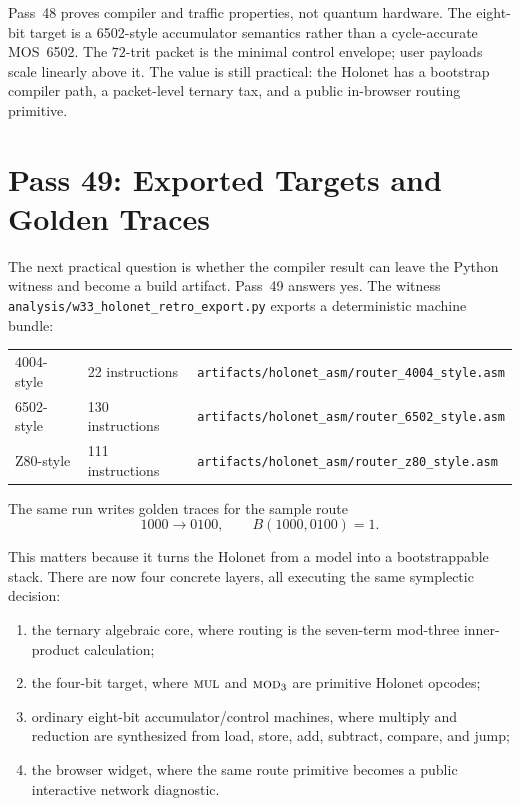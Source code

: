 \documentclass[11pt]{article}
\begin{document}
\begin{honestbox}
Pass~48 proves compiler and traffic properties, not quantum hardware.  The
eight-bit target is a 6502-style accumulator semantics rather than a
cycle-accurate MOS~6502.  The \(72\)-trit packet is the minimal control
envelope; user payloads scale linearly above it.  The value is still practical:
the Holonet has a bootstrap compiler path, a packet-level ternary tax, and a
public in-browser routing primitive.
\end{honestbox}

\section{Pass 49: Exported Targets and Golden Traces}
\label{sec:pass49}
The next practical question is whether the compiler result can leave the
Python witness and become a build artifact.  Pass~49 answers yes.  The witness
\texttt{analysis/w33\_holonet\_retro\_export.py} exports a deterministic
machine bundle:
\begin{center}
\begin{tabular}{lll}
4004-style & 22 instructions & \texttt{artifacts/holonet\_asm/router\_4004\_style.asm}\\
6502-style & 130 instructions & \texttt{artifacts/holonet\_asm/router\_6502\_style.asm}\\
Z80-style & 111 instructions & \texttt{artifacts/holonet\_asm/router\_z80\_style.asm}
\end{tabular}
\end{center}
The same run writes golden traces for the sample route
\[
  1000\to0100,\qquad B(1000,0100)=1.
\]

This matters because it turns the Holonet from a model into a bootstrappable
stack.  There are now four concrete layers, all executing the same symplectic
decision:
\begin{enumerate}[leftmargin=1.4em]
\item the ternary algebraic core, where routing is the seven-term mod-three
inner-product calculation;
\item the four-bit target, where \(\textsc{mul}\) and \(\textsc{mod}_3\) are
primitive Holonet opcodes;
\item ordinary eight-bit accumulator/control machines, where multiply and
reduction are synthesized from load, store, add, subtract, compare, and jump;
\item the browser widget, where the same route primitive becomes a public
interactive network diagnostic.
\end{enumerate}
\end{document}
